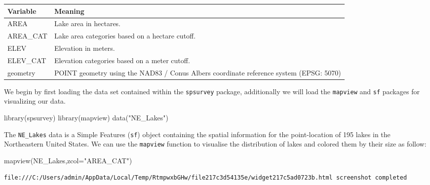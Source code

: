 \documentclass[
  letterpaper,
  DIV=11,
  numbers=noendperiod]{scrartcl}
\newenvironment{Shaded}{\begin{snugshade}}{\end{snugshade}}
\newcommand{\AttributeTok}[1]{\textcolor[rgb]{0.40,0.45,0.13}{#1}}
\newcommand{\FunctionTok}[1]{\textcolor[rgb]{0.28,0.35,0.67}{#1}}
\newcommand{\NormalTok}[1]{\textcolor[rgb]{0.00,0.23,0.31}{#1}}
\newcommand{\StringTok}[1]{\textcolor[rgb]{0.13,0.47,0.30}{#1}}
\begin{document}
\begin{longtable}[]{@{}
  >{\raggedright\arraybackslash}p{}
  >{\raggedright\arraybackslash}p{}@{}}
\toprule\noalign{}
\begin{minipage}[b]{\linewidth}\raggedright
Variable
\end{minipage} & \begin{minipage}[b]{\linewidth}\raggedright
Meaning
\end{minipage} \\
\midrule\noalign{}
\endhead
\bottomrule\noalign{}
\endlastfoot
AREA & Lake area in hectares. \\
AREA\_CAT & Lake area categories based on a hectare cutoff. \\
ELEV & Elevation in meters. \\
ELEV\_CAT & Elevation categories based on a meter cutoff. \\
geometry & POINT geometry using the NAD83 / Conus Albers coordinate
reference system (EPSG: 5070) \\
\end{longtable}

We begin by first loading the data set contained within the
\texttt{spsurvey} package, additionally we will load the
\texttt{mapview} and \texttt{sf} packages for visualizing our data.

\begin{Shaded}
\begin{Highlighting}[]
\FunctionTok{library}\NormalTok{(spsurvey)}
\FunctionTok{library}\NormalTok{(mapview)}
\FunctionTok{data}\NormalTok{(}\StringTok{"NE\_Lakes"}\NormalTok{)}
\end{Highlighting}
\end{Shaded}

The \texttt{NE\_Lakes} data is a Simple Features (\texttt{sf}) object
containing the spatial information for the point-location of 195 lakes
in the Northeastern United States. We can use the \texttt{mapview}
function to visualise the distribution of lakes and colored them by
their size as follow:

\begin{Shaded}
\begin{Highlighting}[]
\FunctionTok{mapview}\NormalTok{(NE\_Lakes,}\AttributeTok{zcol=}\StringTok{"AREA\_CAT"}\NormalTok{)}
\end{Highlighting}
\end{Shaded}

\begin{verbatim}
file:///C:/Users/admin/AppData/Local/Temp/RtmpwxbGHw/file217c3d54135e/widget217c5ad0723b.html screenshot completed
\end{verbatim}
\end{document}
